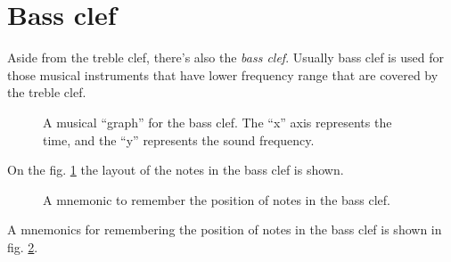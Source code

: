 \documentclass[../sparc.tex]{subfiles}
\begin{document}
\newpage
\section{Bass clef}

Aside from the treble clef, there's also the \emph{bass clef}.  Usually bass
clef is used for those musical instruments that have lower frequency range that
are covered by the treble clef.

\begin{figure}[ht]
  \centering
  \caption{A musical ``graph'' for the bass clef.  The ``x'' axis represents the
    time, and the ``y'' represents the sound frequency.}
  \label{fig:lilypond-bass-clef}
\end{figure}

On the fig. \ref{fig:lilypond-bass-clef} the layout of the notes in the bass
clef is shown.

\begin{figure}[ht]
  \centering
  \caption{A mnemonic to remember the position of notes in the bass clef.}
  \label{fig:lilypond-bass-clef-mnemonic}
\end{figure}

A mnemonics for remembering the position of notes in the bass clef is shown in
fig. \ref{fig:lilypond-bass-clef-mnemonic}.
\end{document}
